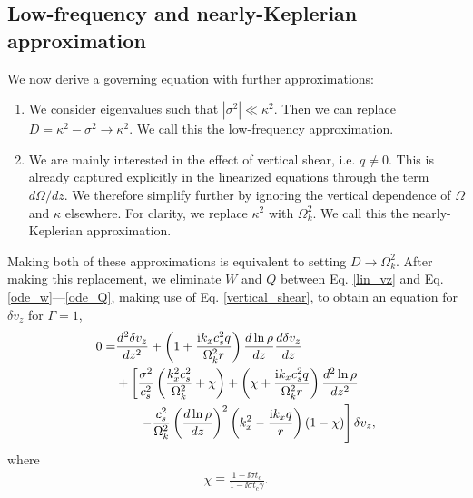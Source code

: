\subsection{Low-frequency and nearly-Keplerian
  approximation}\label{approx_gov} 
We now derive a governing equation with further approximations:
\begin{enumerate}
\item We consider eigenvalues such that
  $|\sigma^2|\ll \kappa^2$. Then we can replace $D=\kappa^2 -\sigma^2\to
  \kappa^2$. %
  We call this the low-frequency approximation. 
\item We are mainly interested in the effect of vertical shear, i.e. $q\neq
  0$. This is already captured explicitly in the linearized equations through
  the term $d\Omega/dz$. We therefore simplify 
  further by ignoring the vertical dependence of $\Omega$ and $\kappa$
  elsewhere. For clarity, we replace $\kappa^2$ with
  $\Omega_k^2$. We call this the nearly-Keplerian approximation. 
  
\end{enumerate}
Making both of these approximations is equivalent to setting 
$D\to\Omega_k^2$.  After making this replacement, we eliminate $W$ and
$Q$ between  Eq. \ref{lin_vz} and Eq. \ref{ode_w}---\ref{ode_Q},
making use of Eq. \ref{vertical_shear}, to
obtain an equation for $\delta v_z$ for $\Gamma=1$,
\begin{align}
  0 =& \frac{d^2\delta v_z}{dz^2} + \left(1 + \frac{\mathrm{i} k_x c_s^2
      q}{\Omega_k^2r}\right)\frac{d\ln\rho}{dz}\frac{d\delta
    v_z}{dz} \notag\\
  &+ \left[\frac{\sigma^2}{c_s^2}\left(\frac{k_x^2c_s^2}{\Omega_k^2} +
      \chi\right) + \left(\chi + \frac{\mathrm{i} k_x c_s^2
        q}{\Omega_k^2r}\right)\frac{d^2\ln\rho}{dz^2}\right. \notag\\
  &\phantom{+=}\left.-
    \frac{c_s^2}{\Omega_k^2}\left(\frac{d\ln\rho}{dz}\right)^2\left(k_x^2 -
      \frac{\mathrm{i} k_x q}{r}\right)
    \left(1-\chi\right) 
  \right]\delta v_z,\label{vertiso_gov}
\end{align}
where
\begin{align}
  \chi \equiv \frac{1-\ii\sigma t_c}{1-\ii\sigma t_c\gamma}.
\end{align}

